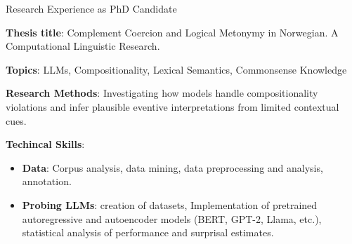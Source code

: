 \begin{rubric}{Research Experience as PhD Candidate}

\parbox{\textwidth}{
  \textbf{Thesis title}: Complement Coercion and Logical Metonymy in Norwegian. A Computational Linguistic Research.\par
  \textbf{Topics}: LLMs, Compositionality, Lexical Semantics, Commonsense Knowledge\par

\textbf{Research Methods}: Investigating how models handle compositionality violations and infer plausible eventive interpretations from limited contextual cues.

\textbf{Techincal Skills}: 
\begin{itemize}
    \item \textbf{Data}: Corpus analysis, data mining, data preprocessing and analysis, annotation.
    \item \textbf{Probing LLMs}: creation of datasets, Implementation of pretrained  autoregressive and autoencoder models (BERT, GPT-2, Llama, etc.), statistical analysis of performance and surprisal estimates.

\end{itemize}



        
}
\end{rubric}
